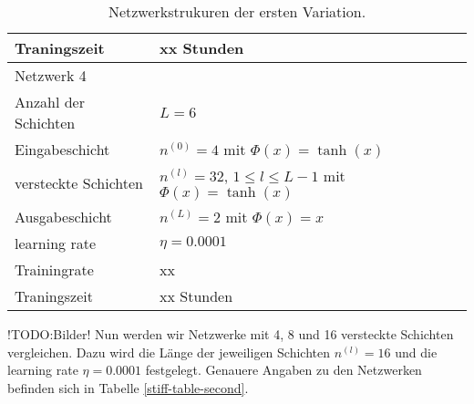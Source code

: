 \begin{table}
\begin{tabular}{ l | l }
              Traningszeit & xx Stunden \\
              \hline
              Netzwerk 4 & \\
              \hline
              Anzahl der Schichten & $L=6$ \\
              Eingabeschicht & $n^{(0)}=4$ mit $\Phi(x)=\tanh(x)$ \\
              versteckte Schichten & $n^{(l)}=32$, $1\leq l \leq L-1$ mit $\Phi(x)=\tanh(x)$ \\
              Ausgabeschicht & $n^{(L)}=2$ mit $\Phi(x)=x$ \\
              learning rate & $\eta=0.0001$ \\
              Trainingrate & xx \\
              Traningszeit & xx Stunden \\
              \hline
       \end{tabular}
       \caption{Netzwerkstrukuren der ersten Variation.}
       \label{stiff-table-first}
\end{table}
!TODO:Bilder!
Nun werden wir Netzwerke mit 4, 8 und 16 versteckte Schichten vergleichen. Dazu wird die Länge der jeweiligen Schichten
$n^{(l)}=16$ und die learning rate $\eta=0.0001$ festgelegt. Genauere Angaben zu den Netzwerken befinden sich in Tabelle
\ref{stiff-table-second}.
